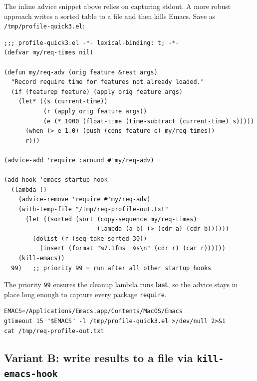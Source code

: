 \begin{expertdepth}
The inline advice snippet above relies on capturing stdout. A more robust approach writes a sorted table to a file and then kills Emacs. Save as \texttt{/tmp/profile-quick3.el}:

\begin{verbatim}
;;; profile-quick3.el -*- lexical-binding: t; -*-
(defvar my/req-times nil)

(defun my/req-adv (orig feature &rest args)
  "Record require time for features not already loaded."
  (if (featurep feature) (apply orig feature args)
    (let* ((s (current-time))
           (r (apply orig feature args))
           (e (* 1000 (float-time (time-subtract (current-time) s)))))
      (when (> e 1.0) (push (cons feature e) my/req-times))
      r)))

(advice-add 'require :around #'my/req-adv)

(add-hook 'emacs-startup-hook
  (lambda ()
    (advice-remove 'require #'my/req-adv)
    (with-temp-file "/tmp/req-profile-out.txt"
      (let ((sorted (sort (copy-sequence my/req-times)
                          (lambda (a b) (> (cdr a) (cdr b))))))
        (dolist (r (seq-take sorted 30))
          (insert (format "%7.1fms  %s\n" (cdr r) (car r))))))
    (kill-emacs))
  99)   ;; priority 99 = run after all other startup hooks
\end{verbatim}

The priority \texttt{99} ensures the cleanup lambda runs \textbf{last}, so the advice stays in place long enough to capture every package \texttt{require}.

\begin{verbatim}
EMACS=/Applications/Emacs.app/Contents/MacOS/Emacs
gtimeout 15 "$EMACS" -l /tmp/profile-quick3.el >/dev/null 2>&1
cat /tmp/req-profile-out.txt
\end{verbatim}

\end{expertdepth}

\subsection{Variant B: write results to a file via \texttt{kill-emacs-hook}}\label{variant-b-write-results-to-a-file-via-kill-emacs-hook}


